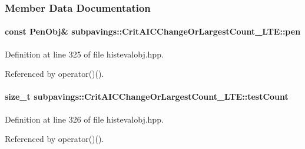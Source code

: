 \subsubsection{\-Member \-Data \-Documentation}
\hypertarget{classsubpavings_1_1CritAICChangeOrLargestCount__LTE_ab103ee5920edae553b76bddc36244e89}{
\paragraph[{pen}]{\setlength{\rightskip}{0pt plus 5cm}const {\bf \-Pen\-Obj}\& {\bf subpavings\-::\-Crit\-A\-I\-C\-Change\-Or\-Largest\-Count\-\_\-\-L\-T\-E\-::pen}}}\label{classsubpavings_1_1CritAICChangeOrLargestCount__LTE_ab103ee5920edae553b76bddc36244e89}


\-Definition at line 325 of file histevalobj.\-hpp.



\-Referenced by operator()().

\hypertarget{classsubpavings_1_1CritAICChangeOrLargestCount__LTE_a18efb7c7d3d958b540124bcf831581c3}{
\paragraph[{test\-Count}]{\setlength{\rightskip}{0pt plus 5cm}size\-\_\-t {\bf subpavings\-::\-Crit\-A\-I\-C\-Change\-Or\-Largest\-Count\-\_\-\-L\-T\-E\-::test\-Count}}}\label{classsubpavings_1_1CritAICChangeOrLargestCount__LTE_a18efb7c7d3d958b540124bcf831581c3}


\-Definition at line 326 of file histevalobj.\-hpp.



\-Referenced by operator()().

